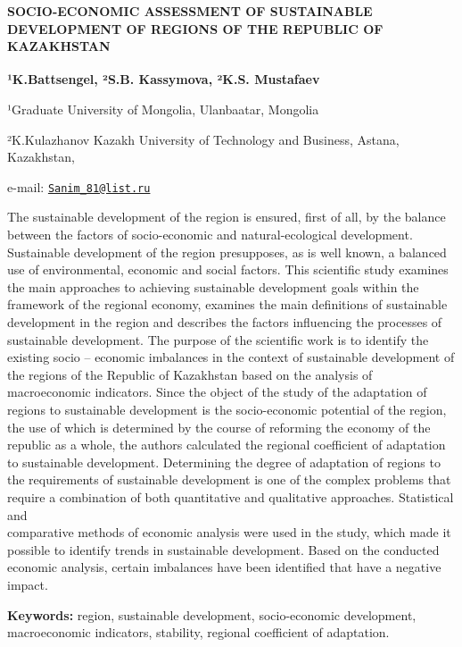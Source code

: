 \begin{articleheader}
{\bfseries SOCIO-ECONOMIC ASSESSMENT OF SUSTAINABLE DEVELOPMENT OF REGIONS
OF THE REPUBLIC OF KAZAKHSTAN}

{\bfseries ¹K.Battsengel\textsuperscript{\envelope }, ²S.B. Kassymova, ²K.S.
Mustafaev}
\end{articleheader}

\begin{affiliation}
¹Graduate University of Mongolia, Ulanbaatar, Mongolia

²K.Kulazhanov Kazakh University of Technology and Business, Astana,
Kazakhstan,

e-mail: \href{mailto:Sanim_81@list.ru}{\nolinkurl{Sanim\_81@list.ru}}
\end{affiliation}

The sustainable development of the region is ensured, first of all, by
the balance between the factors of socio-economic and natural-ecological
development. Sustainable development of the region presupposes, as is
well known, a balanced use of environmental, economic and social
factors. This scientific study examines the main approaches to achieving
sustainable development goals within the framework of the regional
economy, examines the main definitions of sustainable development in the
region and describes the factors influencing the processes of
sustainable development. The purpose of the scientific work is to
identify the existing socio -- economic imbalances in the context of
sustainable development of the regions of the Republic of Kazakhstan
based on the analysis of macroeconomic indicators. Since the object of
the study of the adaptation of regions to sustainable development is the
socio-economic potential of the region, the use of which is determined
by the course of reforming the economy of the republic as a whole, the
authors calculated the regional coefficient of adaptation to sustainable
development. Determining the degree of adaptation of regions to the
requirements of sustainable development is one of the complex problems
that require a combination of both quantitative and qualitative
approaches. Statistical and \\comparative methods of economic analysis
were used in the study, which made it possible to identify trends in
sustainable development. Based on the conducted economic analysis,
certain imbalances have been identified that have a negative impact.

{\bfseries Keywords:} region, sustainable development, socio-economic
development, macroeconomic indicators, stability, regional coefficient
of adaptation.

